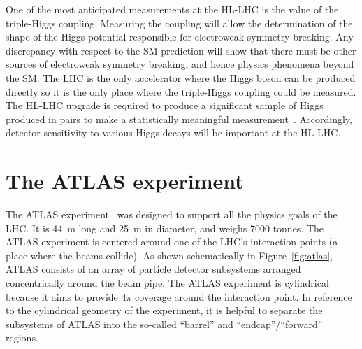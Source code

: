 One of the most anticipated measurements at the HL-LHC is the value of the triple-Higgs coupling. Measuring the coupling will allow the determination of the shape of the Higgs potential responsible for electroweak symmetry breaking. Any discrepancy with respect to the SM prediction will show that there must be other sources of electroweak symmetry breaking, and hence physics phenomena beyond the SM. The LHC is the only accelerator where the Higgs boson can be produced directly so it is the only place where the triple-Higgs coupling could be measured. The HL-LHC upgrade is required to produce a significant sample of Higgs produced in pairs to make a statistically meaningful measurement~\cite{dainese_physics_2018, cepeda_report_2018}. Accordingly, detector sensitivity to various Higgs decays will be important at the HL-LHC.


\section{The ATLAS experiment}
\label{sec:atlas}

The ATLAS experiment~\cite{collaboration_atlas_2008} was designed to support all the physics goals of the LHC. It is \SI{44}{\meter} long and \SI{25}{\meter} in diameter, and weighs 7000 tonnes. The ATLAS experiment is centered around one of the LHC's interaction points (a place where the beams collide). As shown schematically in Figure~\ref{fig:atlas}, ATLAS consists of an array of particle detector subsystems arranged concentrically around the beam pipe.  The ATLAS experiment is cylindrical because it aims to provide 4$\pi$ coverage around the interaction point. In reference to the cylindrical geometry of the experiment, it is helpful to separate the subsystems of ATLAS into the so-called ``barrel'' and ``endcap''/``forward'' regions.

